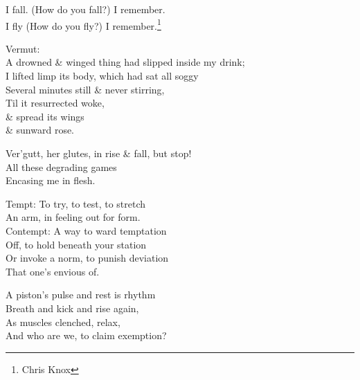 
I fall. (How do you fall?) I remember. \\
I fly  (How do you fly?) I remember.\footnote{Chris Knox}

Vermut: \\
A drowned \& winged thing had slipped inside my drink; \\
I lifted limp its body, which had sat all soggy \\
Several minutes still \& never stirring, \\
Til it resurrected woke, \\
\& spread its wings \\
\& sunward rose.

Ver'gutt, her glutes, in rise \& fall, but stop! \\
All these degrading games \\
Encasing me in flesh.


Tempt: To try, to test, to stretch \\
An arm, in feeling out for form. \\
Contempt: A way to ward temptation \\
Off, to hold beneath your station \\
Or invoke a norm, to punish deviation \\
That one's envious of.

A piston's pulse and rest is rhythm  \\
Breath and kick and rise again, \\
As muscles clenched, relax, \\
And who are we, to claim exemption?